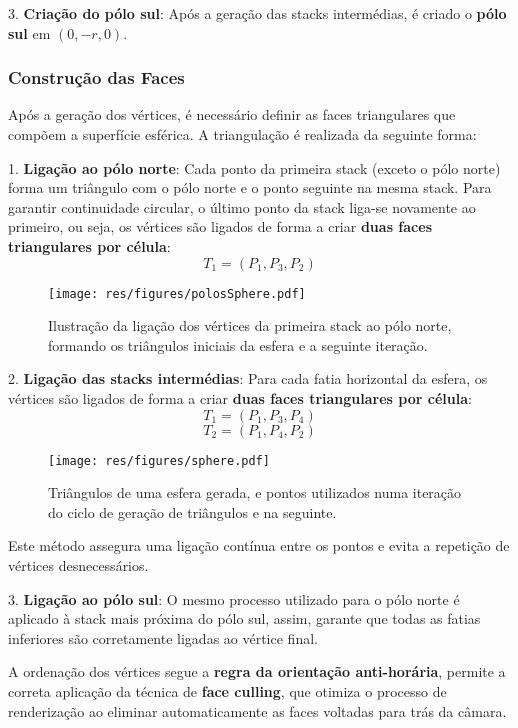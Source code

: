 \documentclass[12pt, a4paper]{article}
\begin{document}
3. \textbf{Criação do pólo sul}: Após a geração das stacks intermédias, é criado o \textbf{pólo sul} em \( (0, -r, 0) \).   

\subsubsection{Construção das Faces}
Após a geração dos vértices, é necessário definir as faces triangulares que compõem a superfície esférica. A triangulação é realizada da seguinte forma:  

1. \textbf{Ligação ao pólo norte}: Cada ponto da primeira stack (exceto o pólo norte) forma um triângulo com o pólo norte e o ponto
seguinte na mesma stack. Para garantir continuidade circular, o último ponto da stack liga-se
novamente ao primeiro, ou seja, os vértices são ligados de forma a criar \textbf{duas faces
triangulares por célula}:
\[
T_1 = (P_1, P_3, P_2)
\]

\begin{figure}[H]
    \centering
    \texttt{[image: res/figures/polosSphere.pdf]}
    \caption{
        Ilustração da ligação dos vértices da primeira stack ao pólo norte, formando os triângulos iniciais da esfera e a seguinte iteração.
    }
\end{figure}

2. \textbf{Ligação das stacks intermédias}:  
Para cada fatia horizontal da esfera, os vértices são ligados de forma a criar \textbf{duas faces
triangulares por célula}:
\[
T_1 = (P_1, P_3, P_4)
\]
\[
T_2 = (P_1, P_4, P_2)
\]

\begin{figure}[H]
    \centering
    \texttt{[image: res/figures/sphere.pdf]}
    \caption{
        Triângulos de uma esfera gerada, e pontos utilizados numa iteração do ciclo de geração
        de triângulos e na seguinte.
    }
\end{figure}

Este método assegura uma ligação contínua entre os pontos e evita a repetição de vértices
desnecessários.

3. \textbf{Ligação ao pólo sul}: O mesmo processo utilizado para o pólo norte é aplicado à stack mais
próxima do pólo sul, assim, garante que todas as fatias inferiores são corretamente ligadas ao vértice final.    

A ordenação dos vértices segue a \textbf{regra da orientação anti-horária}, permite a correta
aplicação da técnica de \textbf{face culling}, que otimiza o processo de renderização ao eliminar
automaticamente as faces voltadas para trás da câmara.  
\end{document}
